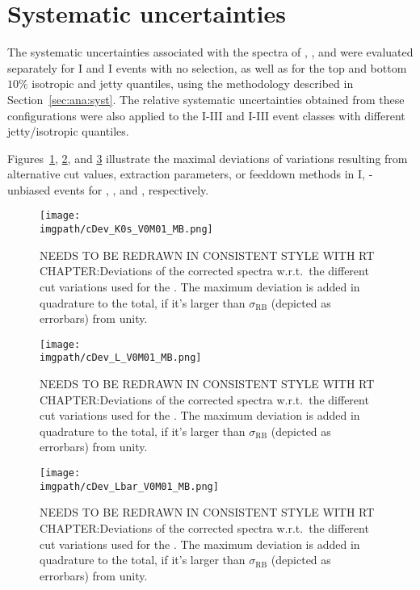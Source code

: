 \section{Systematic uncertainties}

The systematic uncertainties associated with the \pt spectra of \KOs, \LA, and \AL were evaluated separately for \NSPD I and \VOM I events with no \SOPT selection, as well as for the top and bottom $10\%$ isotropic and jetty quantiles, using the methodology described in Section~\ref{sec:ana:syst}. The relative systematic uncertainties obtained from these configurations were also applied to the \NSPD I-III and \VOM I-III event classes with different jetty/isotropic quantiles.

Figures~\ref{fig:sphero:systK0s}, \ref{fig:sphero:systLA}, and \ref{fig:sphero:systAL} illustrate the maximal deviations of variations resulting from alternative cut values, extraction parameters, or feeddown methods in \VOM I, \SOPT-unbiased events for \KOs, \LA, and \AL, respectively. 

\begin{figure}[H]
  \centering
\texttt{[image: \\imgpath/cDev\_K0s\_V0M01\_MB.png]}
  \caption{NEEDS TO BE REDRAWN IN CONSISTENT STYLE WITH RT CHAPTER:Deviations of the corrected spectra w.r.t.\ the different cut variations used for the \Ks . The maximum deviation is added in quadrature to the total, if it's larger than $\sigma_\mathrm{RB}$ (depicted as errorbars) from unity.}
  \label{fig:sphero:systK0s}
\end{figure}

\begin{figure}[H]
  \centering
\texttt{[image: \\imgpath/cDev\_L\_V0M01\_MB.png]}
  \caption{NEEDS TO BE REDRAWN IN CONSISTENT STYLE WITH RT CHAPTER:Deviations of the corrected spectra w.r.t.\ the different cut variations used for the \Ks . The maximum deviation is added in quadrature to the total, if it's larger than $\sigma_\mathrm{RB}$ (depicted as errorbars) from unity.}
  \label{fig:sphero:systLA}
\end{figure}

\begin{figure}[H]
  \centering
\texttt{[image: \\imgpath/cDev\_Lbar\_V0M01\_MB.png]}
  \caption{NEEDS TO BE REDRAWN IN CONSISTENT STYLE WITH RT CHAPTER:Deviations of the corrected spectra w.r.t.\ the different cut variations used for the \Ks . The maximum deviation is added in quadrature to the total, if it's larger than $\sigma_\mathrm{RB}$ (depicted as errorbars) from unity.}
  \label{fig:sphero:systAL}
\end{figure}

